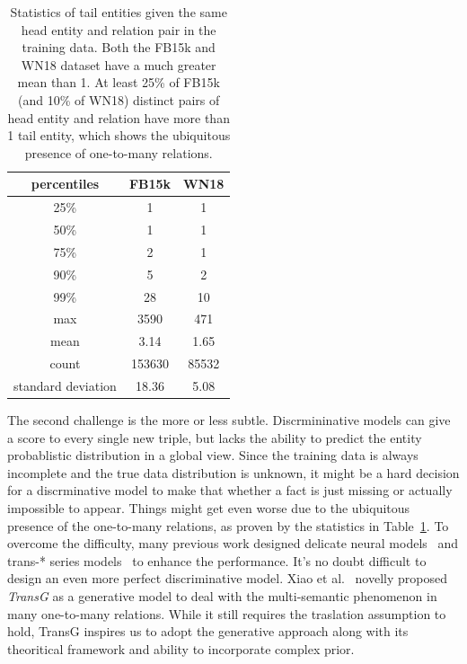 \documentclass[twocolumn,a4paper,10pt,review,5p]{elsarticle}
\begin{document}
\begin{table}
    \centering
    \begin{tabular}{ccc}
        \toprule
        percentiles & FB15k & WN18 \\
        \midrule
        25\% &  1   & 1  \\
        50\% &  1   & 1 \\
        75\% &  2   & 1 \\
        90\% &  5   & 2 \\
        99\% &  28  & 10 \\
        max & 3590  &  471 \\
        \midrule
        mean &  3.14 & 1.65 \\
        count & 153630 & 85532 \\
        standard deviation & 18.36 & 5.08 \\
        \bottomrule
    \end{tabular}
    \caption{Statistics of tail entities given the same head entity and relation pair in the training data. Both the FB15k and WN18 dataset have a much greater mean than 1. At least 25\% of FB15k (and 10\% of WN18) distinct pairs of head entity and relation have more than 1 tail entity, which shows the ubiquitous presence of one-to-many relations. }
\label{one-to-many}
\end{table}


The second challenge is the more or less subtle. Discrmininative models can give a score to every single new triple, but lacks the ability to predict the entity probablistic distribution in a global view. Since the training data is always incomplete and the true data distribution is unknown, it might be a hard decision for a discrminative model to make that whether a fact is just missing or actually impossible to appear. Things might get even worse due to the ubiquitous presence of the one-to-many relations, as proven by the statistics in Table~\ref{one-to-many}. To overcome the difficulty, many previous work designed delicate neural models~\cite{NTN} and trans-* series models~\cite{TransH2014,TransR2015} to enhance the performance. It's no doubt difficult to design an even more perfect discriminative model. Xiao et al.~\cite{TransG} novelly proposed \emph{TransG} as a generative model to deal with the multi-semantic phenomenon in many one-to-many relations. While it still requires the traslation assumption to hold, TransG inspires us to adopt the generative approach along with its theoritical framework and ability to incorporate complex prior.
\end{document}
